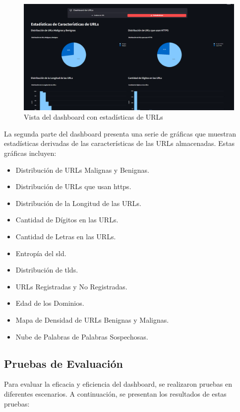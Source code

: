\begin{figure}[H]
    \centering
    \includegraphics[width=\textwidth]{interfazEstadisticas.png}
    \caption{Vista del dashboard con estadísticas de URLs}
\end{figure}

La segunda parte del dashboard presenta una serie de gráficas que muestran estadísticas derivadas de las características de las URLs almacenadas. Estas gráficas incluyen:

\begin{itemize}
    \item Distribución de URLs Malignas y Benignas.
    \item Distribución de URLs que usan \gls{https}.
    \item Distribución de la Longitud de las URLs.
    \item Cantidad de Dígitos en las URLs.
    \item Cantidad de Letras en las URLs.
    \item Entropía del \gls{sld}.
    \item Distribución de \glspl{tld}.
    \item URLs Registradas y No Registradas.
    \item Edad de los Dominios.
    \item Mapa de Densidad de URLs Benignas y Malignas.
    \item Nube de Palabras de Palabras Sospechosas.
\end{itemize}

\subsection*{Pruebas de Evaluación}

Para evaluar la eficacia y eficiencia del dashboard, se realizaron pruebas en diferentes escenarios. A continuación, se presentan los resultados de estas pruebas:

